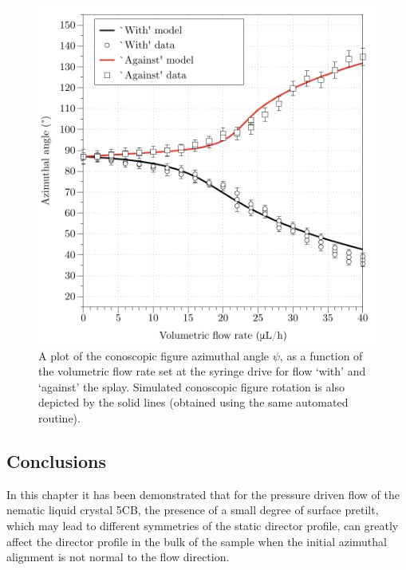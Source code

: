 \begin{figure}
\begin{center}
\includegraphics{Figures/90/with_against_data_plot.pdf}
\end{center}
\caption[A plot of experimental conoscopic figure rotation as a function of flow rate for flow `with' and `against' the splay]{\label{fig:with_against_data_plot}A plot of the conoscopic figure azimuthal angle $\psi$, as a function of the volumetric flow rate set at the syringe drive for flow `with' and `against' the splay. Simulated conoscopic figure rotation is also depicted by the solid lines (obtained using the same automated routine).}
\end{figure}

\subsection{Conclusions}
In this chapter it has been demonstrated that for the pressure driven flow of the nematic liquid crystal 5CB, the presence of a small degree of surface pretilt, which may lead to different symmetries of the static director profile, can greatly affect the director profile in the bulk of the sample when the initial azimuthal alignment is not normal to the flow direction.

